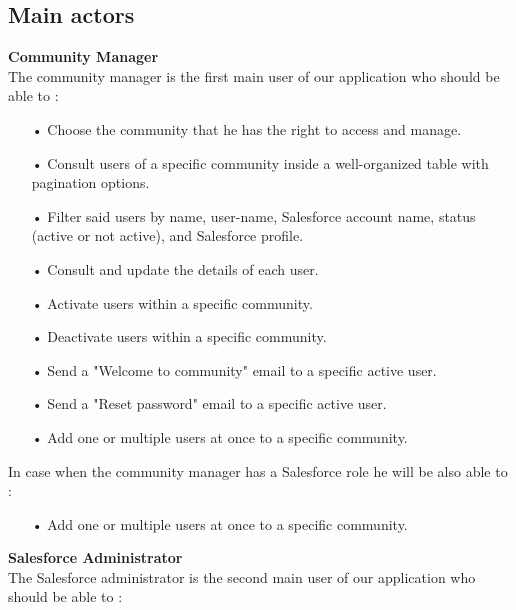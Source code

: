 \subsection*{Main actors}
\textbf{Community Manager}\\
The community manager is the first main user of our application who should be able to :
\begin{itemize}
\item[•] Choose the community that he has the right to access and manage.
\item[•] Consult users of a specific community inside a well-organized table with pagination options.
\item[•] Filter said users by name, user-name, Salesforce account name, status (active or not active), and Salesforce profile.
\item[•] Consult and update the details of each user.
\item[•] Activate users within a specific community.
\item[•] Deactivate users within a specific community.
\item[•] Send a "Welcome to community" email to a specific active user.
\item[•] Send a "Reset password" email to a specific active user.
\item[•] Add one or multiple users at once to a specific community.
\end{itemize}
In case when the community manager has a Salesforce role he will be also able to :
\begin{itemize}
\item[•] Add one or multiple users at once to a specific community.
\end{itemize}
\textbf{Salesforce Administrator}\\
The Salesforce administrator is the second main user of our application who should be able to :
